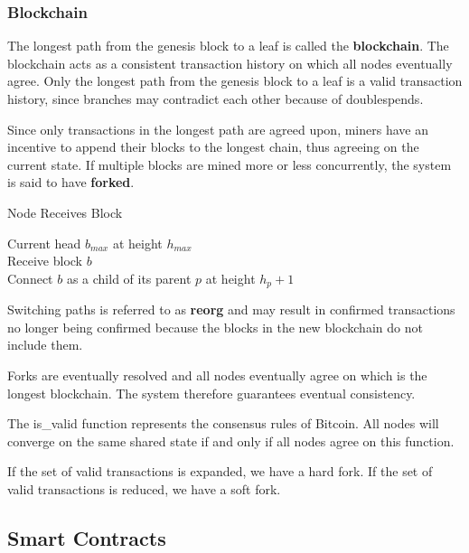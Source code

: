 \subsubsection{Blockchain}

The longest path from the genesis block to a leaf is called the \textbf{blockchain}. The blockchain acts as a consistent transaction history on which all nodes eventually agree. Only the longest path from the genesis block to a leaf is a valid transaction history, since branches may contradict each other because of doublespends. \medskip

Since only transactions in the longest path are agreed upon, miners have an incentive to append their blocks to the longest chain, thus agreeing on the current state. If multiple blocks are mined more or less concurrently, the system is said to have \textbf{forked}.\medskip

\begin{algorithm}[H]
\caption{Node Receives Block}
	Current head $b_{max}$ at height $h_{max}$\\
	Receive block $b$\\
	Connect $b$ as a child of its parent $p$ at height $h_p + 1$\\
\end{algorithm}
\medskip

Switching paths is referred to as \textbf{reorg} and may result in confirmed transactions no longer being confirmed because the blocks in the new blockchain do not include them. \medskip

Forks are eventually resolved and all nodes eventually agree on which is the longest blockchain. The system therefore guarantees eventual consistency. \medskip

The is\_valid function represents the consensus rules of Bitcoin. All nodes will converge on the same shared state if and only if all nodes agree on this function. \medskip

If the set of valid transactions is expanded, we have a hard fork. If the set of valid transactions is reduced, we have a soft fork.


\subsection{Smart Contracts}


